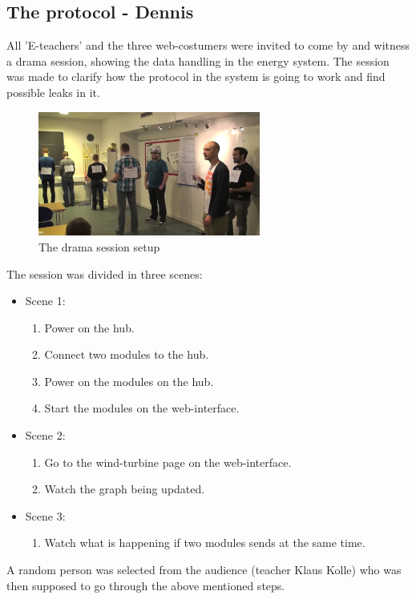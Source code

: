 \subsection{The protocol - Dennis}
All 'E-teachers' and the three web-costumers were invited to come by and witness a drama session, showing the data handling in the energy system. The session was made to clarify how the protocol in the system is going to work and find possible leaks in it. 
\begin{figure}[H]
	\center
		\includegraphics[width=0.65\textwidth]{images/drama_setup.png}
   	\caption{The drama session setup}
   	\label{fig:drama_session_setup}
\end{figure}

The session was divided in three scenes:
\begin{itemize}
	\item Scene 1:
		\begin{enumerate}
			\item Power on the hub.
			\item Connect two modules to the hub.
			\item Power on the modules on the hub.
			\item Start the modules on the web-interface.
		\end{enumerate}
	\item Scene 2:
		\begin{enumerate}
			\item Go to the wind-turbine page on the web-interface.
			\item Watch the graph being updated.
		\end{enumerate}
	\item Scene 3:
		\begin{enumerate}
			\item Watch what is happening if two modules sends at the same time.
		\end{enumerate}
\end{itemize}

A random person was selected from the audience (teacher Klaus Kolle) who was then supposed to go through the above mentioned steps. 

